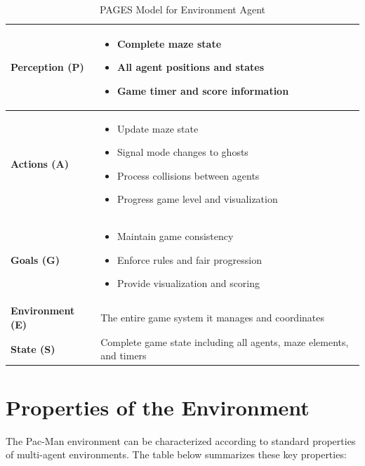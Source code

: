 \documentclass[a4paper, 11pt]{article}
\begin{document}
\begin{table}[h]
\centering
\caption{PAGES Model for Environment Agent}
\begin{tabular}{|p{2.5cm}|p{11cm}|}
\hline
\textbf{Perception (P)} & 
\begin{itemize}
    \item Complete maze state
    \item All agent positions and states
    \item Game timer and score information
\end{itemize} \\
\hline
\textbf{Actions (A)} & 
\begin{itemize}
    \item Update maze state
    \item Signal mode changes to ghosts
    \item Process collisions between agents
    \item Progress game level and visualization
\end{itemize} \\
\hline
\textbf{Goals (G)} & 
\begin{itemize}
    \item Maintain game consistency
    \item Enforce rules and fair progression
    \item Provide visualization and scoring
\end{itemize} \\
\hline
\textbf{Environment (E)} & The entire game system it manages and coordinates \\
\hline
\textbf{State (S)} & Complete game state including all agents, maze elements, and timers \\
\hline
\end{tabular}
\end{table}

\section{Properties of the Environment}

The Pac-Man environment can be characterized according to standard properties of multi-agent environments. The table below summarizes these key properties:
\end{document}
